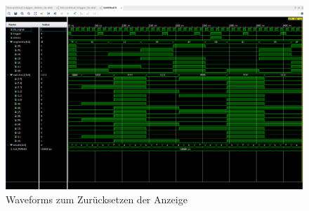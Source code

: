 \documentclass[11pt, a4paper]{article}
\begin{document}
\begin{figure}[H]    
    \centering
    \includegraphics[width=\linewidth]{versuch5Data/hierarchicalDelete.png}
    \caption{Waveforms zum Zurücksetzen der Anzeige}
    \label{waveformDelete}        
\end{figure}

\newpage
\end{document}
